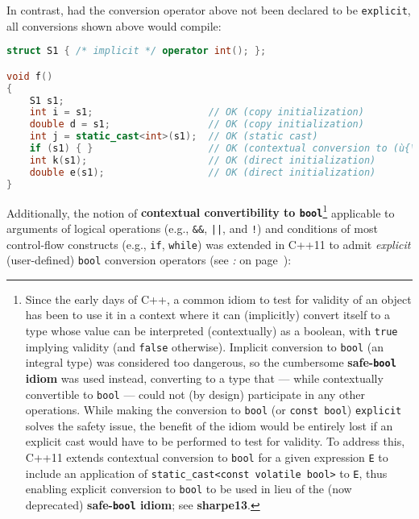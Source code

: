 \noindent In contrast, had the conversion operator above not been declared to be
\texttt{explicit}, all conversions shown above would compile:

\begin{lstlisting}[language=C++]
struct S1 { /* implicit */ operator int(); };

void f()
{
    S1 s1;
    int i = s1;                    // OK (copy initialization)
    double d = s1;                 // OK (copy initialization)
    int j = static_cast<int>(s1);  // OK (static cast)
    if (s1) { }                    // OK (contextual conversion to (ù{\codeincomments{bool}}ù))
    int k(s1);                     // OK (direct initialization)
    double e(s1);                  // OK (direct initialization)
}
\end{lstlisting}
    
\noindent Additionally, the notion of \textbf{contextual convertibility to
\texttt{bool}}{\cprotect\footnote{Since the early days of C++, a common
  idiom to test for validity of an object has been to use it in a
  context where it can (implicitly) convert itself to a type whose value
  can be interpreted (contextually) as a boolean, with \texttt{true}
  implying validity (and \texttt{false} otherwise). Implicit conversion
  to \texttt{bool} (an integral type) was considered too dangerous, 
  so the cumbersome \textbf{safe-\texttt{bool} idiom} was used instead,
  converting to a type that --- while contextually convertible to
  \texttt{bool} --- could not (by design) participate in any other
  operations. While making the conversion to \texttt{bool} (or
  \texttt{const}~\texttt{bool}) \texttt{explicit} solves the safety
  issue, the benefit of the idiom would be entirely lost if an explicit
  cast would have to be performed to test for validity. To address this,
  C++11 extends contextual conversion to \texttt{bool} for a given
  expression \texttt{E} to include an application of
  \texttt{static\_cast<const}~\texttt{volatile}~\texttt{bool>} to
  \texttt{E}, thus enabling explicit conversion to \texttt{bool} to be
  used in lieu of the (now deprecated) \textbf{safe-\texttt{bool} idiom}; see
  \textbf{{sharpe13}}.}} applicable to arguments of logical operations
(e.g., \texttt{\&\&}, \texttt{||}, and \texttt{!}) and conditions of
most control-flow constructs (e.g., \texttt{if}, \texttt{while}) was
extended in C++11 to admit \emph{explicit} (user-defined) \texttt{bool}
conversion operators (see {\it{}: } on page~\pageref{enabling-contextual-conversions-to-bool-as-a-test-for-validity}):

